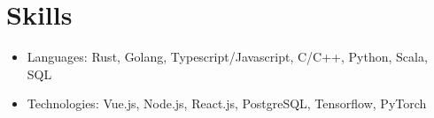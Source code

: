 \documentclass[letterpaper,11pt]{article}
\newcommand{\resumeItem}[2]{
  \item\small{#1{: #2}} \vspace{-2pt}
}
\newcommand{\resumeSubItem}[2]{\resumeItem{#1}{#2} \vspace{-2pt}}
\newcommand{\resumeListStart}{\begin{itemize}[leftmargin=*]}
\newcommand{\resumeListEnd}{\end{itemize}}
\begin{document}
\section{Skills}
  \resumeListStart
    \resumeSubItem{Languages}{Rust, Golang, Typescript/Javascript, C/C++, Python, Scala, SQL}
    \resumeSubItem{Technologies}{Vue.js, Node.js, React.js, PostgreSQL, Tensorflow, PyTorch}
  \resumeListEnd

\end{document}
